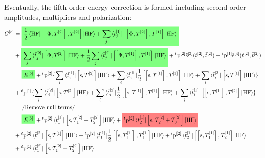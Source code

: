 Eventually, the fifth order energy correction is formed including second order
amplitudes, multipliers and polarization:
\begin{equation}\label{eq:fifth-order-G}
  \begin{aligned}
    G^{[5]} &=
    \highlight{green}
    {
    \frac{1}{2}\braket{\mathrm{HF} |
    \commutator{\commutator{\Phi}{T^{[2]}}}{T^{[2]}}
    | \mathrm{HF}}
    +
    \sum_j \braket{\tbar{j}^{[1]} |
    \commutator{\commutator{\Phi}{T^{[2]}}}{T^{[1]}}
    | \mathrm{HF}}
    }
    \\
    &+ \highlight{green}{\sum_j \braket{\tbar{j}^{[2]} |
      \commutator{\Phi}{T^{[2]}}
    | \mathrm{HF}}
    +
    \frac{1}{2}\sum_j\braket{\tbar{j}^{[2]} |
    \commutator{\commutator{\Phi}{T^{[1]}}}{T^{[1]}}
    | \mathrm{HF}}
    }
    + {}^t\p^{[2]}\tilde{\s}^{[3]}(\tamp{}^{[2]}, \tbar{}^{[2]})
    + {}^t\p^{[1]}\tilde{\s}^{[4]}(\tamp{}^{[2]}, \tbar{}^{[2]}) \\
    &= \highlight{green}{E^{[5]}}
    + {}^t\p^{[2]}
    \lbrace
    \sum_i\braket{\tbar{i}^{[1]} | \commutator{\s}{T^{[2]}} | \mathrm{HF}}
    +
    \sum_i\braket{\tbar{i}^{[1]} |
    \frac{1}{2}\commutator{\commutator{\s}{T^{[1]}}}{T^{[1]}}
    | \mathrm{HF}}
    +
    \sum_i\braket{\tbar{i}^{[2]} | \commutator{\s}{T^{[1]}} | \mathrm{HF}}
    \rbrace \\
    &+ {}^t\p^{[1]}
    \lbrace
    \sum_i\braket{\tbar{i}^{[2]} | \commutator{\s}{T^{[2]}} | \mathrm{HF}}
    +
    \sum_i\braket{\tbar{i}^{[2]} |
    \frac{1}{2}\commutator{\commutator{\s}{T^{[1]}}}{T^{[1]}}
    | \mathrm{HF}}
    +
    \sum_i\braket{\tbar{i}^{[1]} |
    \commutator{\commutator{\s}{T^{[1]}}}{T^{[2]}}
    | \mathrm{HF}}
    \rbrace \\
  &= \left/ \text{Remove null terms} \right/ \\
  &= \highlight{green}{E^{[5]}}
    + {}^t\p^{[2]}\braket{\tbar{1}^{[1]} | \commutator{\s}{T_1^{[2]} + T_2^{[2]}} | \mathrm{HF}}
    + \highlight{red}{
    {}^t\p^{[2]}\braket{\tbar{2}^{[1]} | \commutator{\s}{T_2^{[2]} + T_3^{[2]}} | \mathrm{HF}}
    } \\
    &+ {}^t\p^{[2]}\braket{\tbar{1}^{[2]} | \commutator{\s}{T^{[1]}} | \mathrm{HF}}
    + {}^t\p^{[2]}
    \braket{\tbar{1}^{[1]} |
    \frac{1}{2}\commutator{\commutator{\s}{T_1^{[1]}}}{T_1^{[1]}}
    | \mathrm{HF}}
    + {}^t\p^{[2]}
    \braket{\tbar{2}^{[1]} |
    \commutator{\commutator{\s}{T_1^{[1]}}}{T_2^{[1]}}
    | \mathrm{HF}}
    \\
    &+
    {}^t\p^{[1]}
    \braket{\tbar{1}^{[2]} | \commutator{\s}{T_1^{[2]} + T_2^{[2]}} | \mathrm{HF}}

\end{aligned}
\end{equation}
